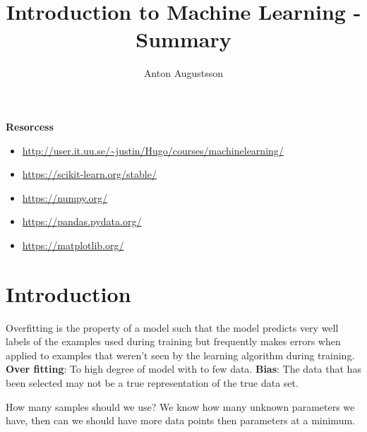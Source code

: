 \documentclass{article}
\title{Introduction to Machine Learning - Summary}
\author{Anton Augustsson}
\begin{document}
\maketitle
\newpage
\tableofcontents
\newpage

\textbf{Resorcess}
\begin{itemize}
    \item \url{http://user.it.uu.se/~justin/Hugo/courses/machinelearning/}
    \item \url{https://scikit-learn.org/stable/}
    \item \url{https://numpy.org/}
    \item \url{https://pandas.pydata.org/}
    \item \url{https://matplotlib.org/}
\end{itemize}

\section{Introduction}
Overfitting is the property of a model such that the model
predicts very well labels of the examples used during training but frequently makes errors
when applied to examples that weren’t seen by the learning algorithm during training.
\textbf{Over fitting}: To high degree of model with to few data.
\textbf{Bias}: The data that has been selected may not be a true representation of 
the true data set. 

How many samples should we use? We know how many unknown parameters we have, then 
can we should have more data points then parameters at a minimum.
\end{document}
